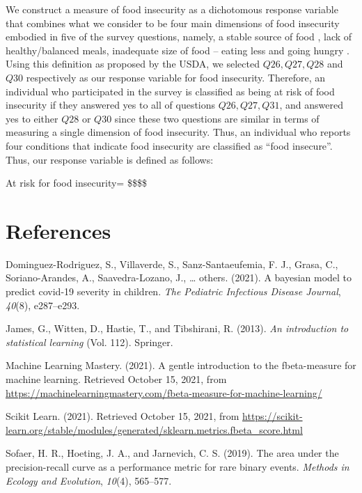 \documentclass[
  10pt,
]{article}
\begin{document}
We construct a measure of food insecurity as a dichotomous response variable that combines what we consider to be four main dimensions of food insecurity embodied in five of the survey questions, namely, a stable source of food , lack of healthy/balanced meals, inadequate size of food -- eating less and going hungry . Using this definition as proposed by the USDA, we selected \(Q26, Q27, Q28\) and \(Q30\) respectively as our response variable for food insecurity. Therefore, an individual who participated in the survey is classified as being at risk of food insecurity if they answered yes to all of questions \(Q26, Q27, Q31\), and answered yes to either \(Q28\) or \(Q30\) since these two questions are similar in terms of measuring a single dimension of food insecurity. Thus, an individual who reports four conditions that indicate food insecurity are classified as ``food insecure''. Thus, our response variable is defined as follows:

At risk for food insecurity= \$\$\$\$

\hypertarget{references}{%
\section*{References}\label{references}}

\hypertarget{refs}{}
\leavevmode\hypertarget{ref-dominguez2021bayesian}{}%
Dominguez-Rodriguez, S., Villaverde, S., Sanz-Santaeufemia, F. J., Grasa, C., Soriano-Arandes, A., Saavedra-Lozano, J., \ldots{} others. (2021). A bayesian model to predict covid-19 severity in children. \emph{The Pediatric Infectious Disease Journal}, \emph{40}(8), e287--e293.

\leavevmode\hypertarget{ref-james2013introduction}{}%
James, G., Witten, D., Hastie, T., and Tibshirani, R. (2013). \emph{An introduction to statistical learning} (Vol. 112). Springer.

\leavevmode\hypertarget{ref-MLM}{}%
Machine Learning Mastery. (2021). A gentle introduction to the fbeta-measure for machine learning. Retrieved October 15, 2021, from \url{https://machinelearningmastery.com/fbeta-measure-for-machine-learning/}

\leavevmode\hypertarget{ref-scikit_learn}{}%
Scikit Learn. (2021). Retrieved October 15, 2021, from \url{https://scikit-learn.org/stable/modules/generated/sklearn.metrics.fbeta_score.html}

\leavevmode\hypertarget{ref-sofaer2019area}{}%
Sofaer, H. R., Hoeting, J. A., and Jarnevich, C. S. (2019). The area under the precision-recall curve as a performance metric for rare binary events. \emph{Methods in Ecology and Evolution}, \emph{10}(4), 565--577.
\end{document}
